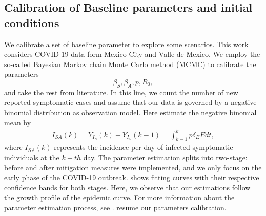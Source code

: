 \subsection{Calibration of Baseline
    parameters and initial conditions}
We calibrate a set of baseline parameter to explore
some scenarios. This work considers COVID-19 data form Mexico City
and Valle de Mexico. We employ the so-called Bayesian Markov chain
Monte Carlo method (MCMC) to calibrate the parameters
$$
    \beta_S, \beta_A, p, R_0,
$$
and take the rest from literature. In this
line, we count the number of new reported symptomatic cases and
assume that our data is governed by a negative binomial
distribution as observation model. Here estimate the negative
binomial mean by
\begin{equation*}\label{incidence}
    \begin{aligned}
        I_{SA}(k) = Y_{I_S}(k) -
        Y_{I_S}(k-1)=\int_{k-1}^k p\delta_EE
        dt,
    \end{aligned}
\end{equation*}
where $I_{SA}(k)$ represents the incidence
per day of infected symptomatic individuals at the $k-th$ day. The
parameter estimation splits into two-stage: before and after
mitigation measures were implemented, and we only focus on
the early phase of the COVID-19 outbreak. 
shows fitting curves with their respective confidence bands for
both stages. Here, we observe that our estimations follow
the growth profile of the epidemic curve. For more information about
the parameter estimation process, see %
.  resume our
parameters calibration.

